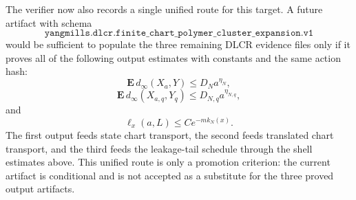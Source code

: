 The verifier now also records a single unified route for this target. A future
artifact with schema
\[
  \texttt{yangmills.dlcr.finite\_chart\_polymer\_cluster\_expansion.v1}
\]
would be sufficient to populate the three remaining DLCR evidence files only
if it proves all of the following output estimates with constants and the same
action hash:
\[
  \mathbf E\,d_\infty(X_a,Y)\leq D_Na^{\eta_N},
\]
\[
  \mathbf E\,d_\infty(X_{a,q},Y_q)\leq D_{N,q}a^{\eta_{N,q}},
\]
and
\[
  \ell_x(a,L)\leq C e^{-m k_N(x)}.
\]
The first output feeds state chart transport, the second feeds translated chart
transport, and the third feeds the leakage-tail schedule through the shell
estimates above. This unified route is only a promotion criterion: the current
artifact is conditional and is not accepted as a substitute for the three
proved output artifacts.

